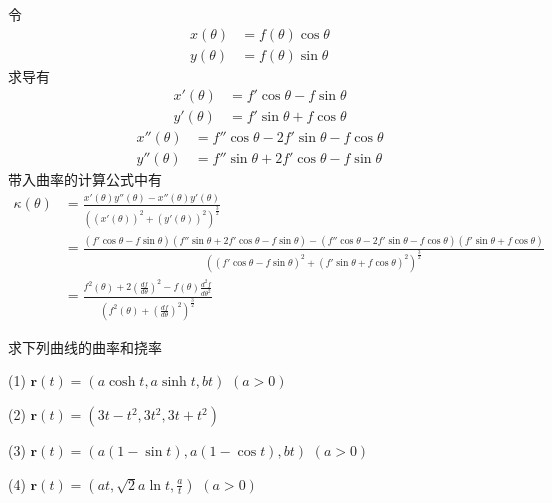 \begin{tcolorbox}
	[breakable, colback = Emerald!10, colframe = cyan!40!green, title = 证明2.3]
	令
	\begin{equation*}
		\begin{split}
			x(\theta) &= f(\theta) \cos \theta \\
			y(\theta) &= f(\theta) \sin \theta
		\end{split}
	\end{equation*}
	求导有
	\begin{equation*}
		\begin{split}
			x'(\theta) &= f'\cos\theta - f\sin\theta \\
			y'(\theta) &= f'\sin\theta + f\cos\theta
		\end{split}
	\end{equation*}
	\begin{equation*}
		\begin{split}
			x''(\theta) &= f''\cos\theta - 2f'\sin\theta -f\cos\theta \\
			y''(\theta) &= f''\sin\theta +2f'\cos\theta -f\sin\theta
		\end{split}
	\end{equation*}
	带入曲率的计算公式中有
	\begin{equation*}
		\begin{split}
			\kappa(\theta)
			&=\frac{x'(\theta)y''(\theta)-x''(\theta)y'(\theta)}{((x'(\theta))^{2}+(y'(\theta))^{2})^{\frac{3}{2}}} \\
			&=\frac{(f'\cos\theta - f\sin\theta)(f''\sin\theta +2f'\cos\theta -f\sin\theta)-(f''\cos\theta - 2f'\sin\theta -f\cos\theta)(f'\sin\theta + f\cos\theta)}{((f'\cos\theta - f\sin\theta)^2+(f'\sin\theta + f\cos\theta)^2)^{\frac{3}{2}}} \\
			&=\frac{f^2(\theta)+2\left( \frac{df}{d\theta}\right)^2-f(\theta)\frac{d^2f}{d\theta^2}}{\left(f^2(\theta)+\left(\frac{df}{d\theta}\right)^2\right)^{\frac{3}{2}}}
		\end{split}
	\end{equation*}
\end{tcolorbox}

\begin{tcolorbox}
	[breakable, colback = Emerald!10, colframe = cyan!40!black, title = 题2.4]
	求下列曲线的曲率和挠率
	
	(1) $\boldsymbol{r}(t) = (a\cosh t, a\sinh t,bt)$ $(a>0)$
	
	(2) $\boldsymbol{r}(t) = (3t-t^2,3t^2,3t+t^2)$
	
	(3) $\boldsymbol{r}(t) = (a(1-\sin t),a(1-\cos t), bt)$ $(a>0)$
	
	(4) $\boldsymbol{r}(t) = (at,\sqrt{2}a\ln t, \frac{a}{t})$ $(a>0)$
\end{tcolorbox}

